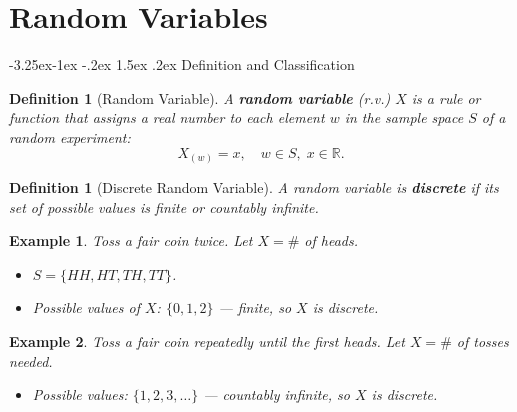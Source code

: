 \documentclass{article}
\makeatletter
\newtheorem{definition}[theorem]{Definition}
\newtheorem{example}{Example}[section]
\theoremstyle{remark}
\newlength{\subsecindent}
\renewcommand\subsection{\@startsection{subsection}{2}{\subsecindent}%
  {-3.25ex\@plus -1ex \@minus -.2ex}%
  {1.5ex \@plus .2ex}%
  {\normalfont\large\bfseries}}
\newenvironment{sub}{%
  \begin{list}{}{%
    \setlength{\leftmargin}{4em}%
    \setlength{\rightmargin}{0pt}%
    \setlength{\topsep}{0pt}%
    \setlength{\partopsep}{0pt}%
    \setlength{\parsep}{\parskip}%
    \setlength{\itemsep}{\parskip}%
  }\item\relax
}{\end{list}}
\newcommand{\R}{\mathbb{R}}
\makeatother
\begin{document}
\section{Random Variables}
\label{sec:det-rv}

\subsection{Definition and Classification}
\begin{sub}

\begin{definition}[Random Variable]
  A \textbf{random variable} (r.v.) $X$ is a rule or function that assigns a
  real number to each element $w$ in the sample space $S$ of a random
  experiment:
  \[
    X_{(w)} = x, \quad w \in S, \; x \in \R.
  \]
\end{definition}

\begin{definition}[Discrete Random Variable]
  A random variable is \textbf{discrete} if its set of possible values is
  finite or countably infinite.
\end{definition}

\begin{example}
  Toss a fair coin twice. Let $X = \#$ of heads.
  \begin{itemize}
    \item $S = \{HH, HT, TH, TT\}$.
    \item Possible values of $X$: $\{0, 1, 2\}$ --- finite, so $X$ is discrete.
  \end{itemize}
\end{example}

\begin{example}
  Toss a fair coin repeatedly until the first heads. Let $X = \#$ of tosses needed.
  \begin{itemize}
    \item Possible values: $\{1, 2, 3, \ldots\}$ --- countably infinite, so $X$ is discrete.
  \end{itemize}
\end{example}

\end{sub}
\end{document}
